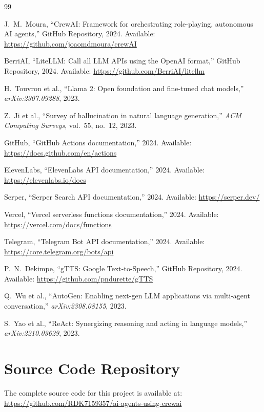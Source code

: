 \documentclass[12pt,a4paper]{report}
\begin{document}
\begin{thebibliography}{99}

 J.~M.~Moura, ``CrewAI: Framework for orchestrating role-playing, autonomous AI agents,'' GitHub Repository, 2024. Available: \url{https://github.com/joaomdmoura/crewAI}

 BerriAI, ``LiteLLM: Call all LLM APIs using the OpenAI format,'' GitHub Repository, 2024. Available: \url{https://github.com/BerriAI/litellm}

 H.~Touvron et al., ``Llama 2: Open foundation and fine-tuned chat models,'' \textit{arXiv:2307.09288}, 2023.

 Z.~Ji et al., ``Survey of hallucination in natural language generation,'' \textit{ACM Computing Surveys}, vol.~55, no.~12, 2023.

 GitHub, ``GitHub Actions documentation,'' 2024. Available: \url{https://docs.github.com/en/actions}

 ElevenLabs, ``ElevenLabs API documentation,'' 2024. Available: \url{https://elevenlabs.io/docs}

 Serper, ``Serper Search API documentation,'' 2024. Available: \url{https://serper.dev/}

 Vercel, ``Vercel serverless functions documentation,'' 2024. Available: \url{https://vercel.com/docs/functions}

 Telegram, ``Telegram Bot API documentation,'' 2024. Available: \url{https://core.telegram.org/bots/api}

 P.~N.~Dekimpe, ``gTTS: Google Text-to-Speech,'' GitHub Repository, 2024. Available: \url{https://github.com/pndurette/gTTS}

 Q.~Wu et al., ``AutoGen: Enabling next-gen LLM applications via multi-agent conversation,'' \textit{arXiv:2308.08155}, 2023.

 S.~Yao et al., ``ReAct: Synergizing reasoning and acting in language models,'' \textit{arXiv:2210.03629}, 2023.

\end{thebibliography}

\appendix
\chapter{Source Code Repository}
The complete source code for this project is available at:\\
\url{https://github.com/RDK7159357/ai-agents-using-crewai}
\end{document}
